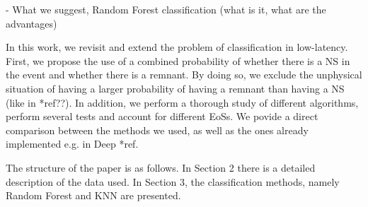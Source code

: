 - What we suggest, Random Forest classification (what is it, what are the advantages)

In this work, we revisit and extend the problem of classification in low-latency. First, we propose the use of a combined probability of whether there is a NS in the event and whether there is a remnant. By doing so, we exclude the unphysical situation of having a larger probability of having a remnant than having a NS (like in *ref??). In addition, we perform a thorough study of different algorithms, perform several tests and account for different EoSs. We povide a direct comparison between the methods we used, as well as the ones already implemented e.g. in Deep *ref. 

The structure of the paper is as follows. In Section 2 there is a detailed description of the data used. In Section 3, the classification methods, namely Random Forest and KNN are presented. 
